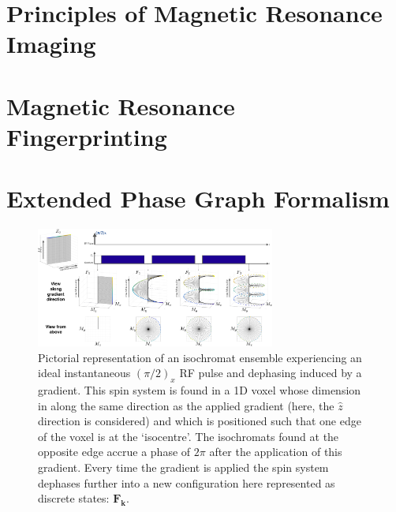 
\appendix
\chapter{Principles of Magnetic Resonance Imaging}
\label{appendixlabelBackgroundMRI}
 

\chapter{Magnetic Resonance Fingerprinting}
\label{appendixlabelBackgroundMRF}
 

\chapter{Extended Phase Graph Formalism}
\label{appendixlabelEPG}
\begin{figure}[ht]
    \centering
    \includegraphics[angle=90,width=0.7\textwidth, keepaspectratio]{images/mrf/effectOfGradsEPG}
    \caption{Pictorial representation of an isochromat ensemble experiencing an ideal instantaneous $(\pi/2)_x$ RF pulse and dephasing induced by a gradient.
    This spin system is found in a 1D voxel whose dimension in along the same direction as the applied gradient (here, the $\hat{z}$ direction is considered) and which is positioned such that one edge of the voxel is at the `isocentre'. The isochromats found at the opposite edge accrue a phase of $2\pi$ after the application of this gradient.
    Every time the gradient is applied the spin system dephases further into a new configuration here represented as discrete states: $\bm{F_k}$.}
    \label{fig:effectOfGradsEPG}
\end{figure}


